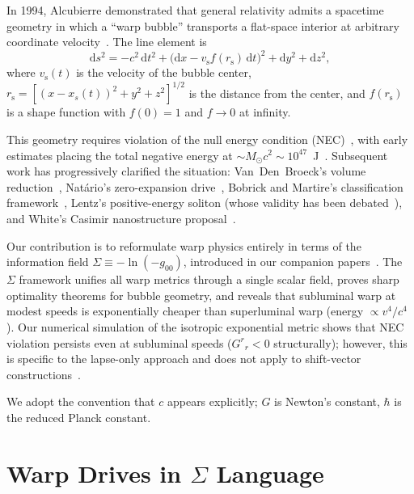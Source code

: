 \documentclass[prd,twocolumn,superscriptaddress,longbibliography]{revtex4-2}
\newcommand{\vs}{v_{\mathrm{s}}}
\newcommand{\rs}{r_{\mathrm{s}}}
\newcommand{\dd}{\mathrm{d}}
\begin{document}
In 1994, Alcubierre demonstrated that general relativity admits
a spacetime geometry in which a ``warp bubble'' transports a
flat-space interior at arbitrary coordinate
velocity~\cite{Alcubierre1994}.  The line element is
\begin{equation}
\label{eq:Alcubierre}
\dd s^2 = -c^2\,\dd t^2
+ \bigl(\dd x - \vs f(\rs)\,\dd t\bigr)^2
+ \dd y^2 + \dd z^2,
\end{equation}
where $\vs(t)$ is the velocity of the bubble center,
$\rs = [(x - x_s(t))^2 + y^2 + z^2]^{1/2}$ is the distance
from the center, and $f(\rs)$ is a shape function with $f(0) = 1$
and $f \to 0$ at infinity.

This geometry requires violation of the null energy condition
(NEC)~\cite{Alcubierre1994,Pfenning1997}, with early estimates
placing the total negative energy at $\sim\!M_\odot c^2 \sim
10^{47}$~J~\cite{Pfenning1997}.  Subsequent work has progressively
clarified the situation: Van~Den~Broeck's volume reduction~\cite{VanDenBroeck1999},
Nat\'{a}rio's zero-expansion drive~\cite{Natario2002},
Bobrick and Martire's classification framework~\cite{BobrickMartire2021},
Lentz's positive-energy soliton (whose validity has been
debated~\cite{Santiago2022,FellHeisenberg2021}), and White's
Casimir nanostructure proposal~\cite{White2021}.

Our contribution is to reformulate warp physics entirely in terms
of the information field $\Sigma \equiv -\ln(-g_{00})$, introduced
in our companion papers~\cite{Huang2026a,Huang2026b,Huang2026c}.
The $\Sigma$ framework unifies all warp metrics through a single
scalar field, proves sharp optimality theorems for bubble
geometry, and reveals that subluminal warp
at modest speeds is exponentially cheaper than superluminal warp
(energy $\propto v^4/c^4$).  Our numerical simulation of the
isotropic exponential metric shows that NEC violation persists
even at subluminal speeds ($G^r{}_r < 0$ structurally); however,
this is specific to the lapse-only approach and does not apply to
shift-vector constructions~\cite{Fuchs2024}.

We adopt the convention that $c$ appears explicitly; $G$ is
Newton's constant, $\hbar$ is the reduced Planck constant.

\section{Warp Drives in $\Sigma$ Language}
\label{sec:sigma}
\end{document}
